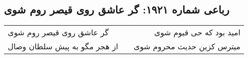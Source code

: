 \begin{center}
\section*{رباعی شماره ۱۹۲۱: گر عاشق روی قیصر روم شوی}
\label{sec:1921}
\begin{longtable}{l p{0.5cm} r}
گر عاشق روی قیصر روم شوی
&&
امید بود که حی قیوم شوی
\\
از هجر مگو به پیش سلطان وصال
&&
میترس کزین حدیث محروم شوی
\\
\end{longtable}
\end{center}
